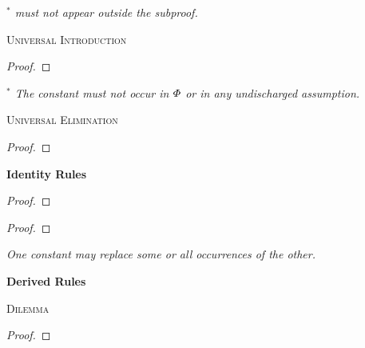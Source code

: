 \begin{footnotesize}\emph{
$^\ast$  must not appear outside the subproof.}
\end{footnotesize}

\textsc{Universal Introduction}


\begin{proof}
	 
\end{proof}

\begin{footnotesize}\emph{
$^\ast$ The constant  must not occur in $\varPhi{}$ or in any undischarged assumption.}
\end{footnotesize}



\textsc{Universal Elimination}

\begin{proof}
	 
\end{proof}




{\large \bf Identity Rules}

\begin{proof}
	 
\end{proof}

\begin{proof}
	 
	 
\end{proof}

\begin{footnotesize}\emph{One constant may replace some or all occurrences of the other.}
\end{footnotesize}





\newpage

{\large \bf Derived Rules}

\textsc{Dilemma}

\begin{proof}
	 
\end{proof}

